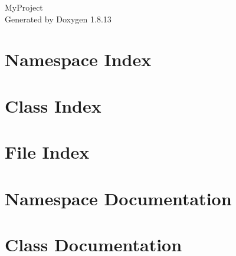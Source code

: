 \documentclass[twoside]{book}
\newcommand{\+}{\discretionary{\mbox{\scriptsize$\hookleftarrow$}}{}{}}
\newcommand{\clearemptydoublepage}{%
  \newpage{\pagestyle{empty}\cleardoublepage}%
}
\begin{document}
\hypersetup{pageanchor=false,
             bookmarksnumbered=true,
             pdfencoding=unicode
            }
\begin{titlepage}
\vspace*{7cm}
\begin{center}%
{\Large My\+Project }\\
\vspace*{1cm}
{\large Generated by Doxygen 1.8.13}\\
\end{center}
\end{titlepage}
\clearemptydoublepage
{}
\tableofcontents
\clearemptydoublepage
{}
\hypersetup{pageanchor=true}

\chapter{Namespace Index}

\chapter{Class Index}

\chapter{File Index}

\chapter{Namespace Documentation}

\chapter{Class Documentation}

























\end{document}
